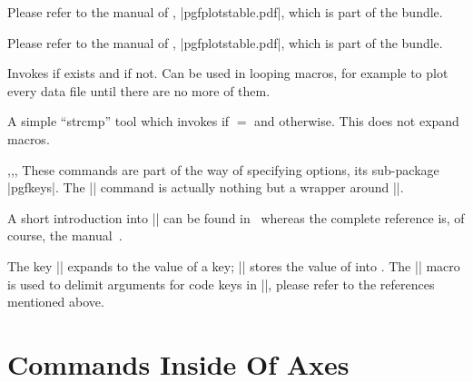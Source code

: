 \begin{command}{\pgfplotstableread{}}
    Please refer to the manual of \PGFPlotstable{}, |pgfplotstable.pdf|, which
    is part of the \PGFPlots{} bundle.
\end{command}

\begin{command}{\pgfplotstabletypeset{}}
    Please refer to the manual of \PGFPlotstable{}, |pgfplotstable.pdf|, which
    is part of the \PGFPlots{} bundle.
\end{command}

\begin{command}{\pgfplotsiffileexists{}}
    Invokes  if  exists and  if
    not. Can be used in looping macros, for example to plot every data file
    until there are no more of them.
\end{command}

\begin{command}{\pgfplotsutilifstringequal{}}
    A simple ``strcmp'' tool which invokes  if 
    $=$ and  otherwise. This does not expand
    macros.
\end{command}

\begin{commandlist}{\pgfkeys,\pgfeov,\pgfkeysvalueof,\pgfkeysgetvalue}
    These commands are part of the \Tikz{} way of specifying options, its
    sub-package |pgfkeys|. The |\pgfplotsset| command is actually nothing but a
    wrapper around |\pgfkeys|.

    A short introduction into |\pgfkeys| can be found in~\cite{keyvalintro}
    whereas the complete reference is, of course, the \Tikz{}
    manual~\cite{tikz}.

    The key |\pgfkeysvalueof| expands to the value of a key;
    |\pgfkeysgetvalue| stores the
    value of  into . The |\pgfeov|
    macro is used to delimit arguments for code keys in |\pgfkeys|, please
    refer to the references mentioned above.
\end{commandlist}


\section[Commands Inside Of PGFPlots Axes]
        {Commands Inside Of {\normalfont\PGFPlots{}} Axes}

